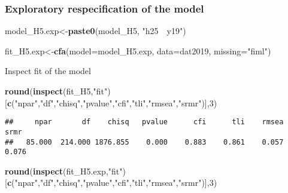 \documentclass[
]{article}
\newenvironment{Shaded}{\begin{snugshade}}{\end{snugshade}}
\newcommand{\DataTypeTok}[1]{\textcolor[rgb]{0.13,0.29,0.53}{#1}}
\newcommand{\DecValTok}[1]{\textcolor[rgb]{0.00,0.00,0.81}{#1}}
\newcommand{\KeywordTok}[1]{\textcolor[rgb]{0.13,0.29,0.53}{\textbf{#1}}}
\newcommand{\NormalTok}[1]{#1}
\newcommand{\StringTok}[1]{\textcolor[rgb]{0.31,0.60,0.02}{#1}}
\begin{document}
\hypertarget{exploratory-respecification-of-the-model-1}{%
\subsubsection{Exploratory respecification of the
model}\label{exploratory-respecification-of-the-model-1}}

\begin{Shaded}
\begin{Highlighting}[]
\NormalTok{model_H5.exp<-}\KeywordTok{paste0}\NormalTok{(model_H5,}
                      \StringTok{"h25~~y19"}\NormalTok{)}
\end{Highlighting}
\end{Shaded}

\begin{Shaded}
\begin{Highlighting}[]
\NormalTok{fit_H5.exp<-}\KeywordTok{cfa}\NormalTok{(}\DataTypeTok{model=}\NormalTok{model_H5.exp,}
              \DataTypeTok{data=}\NormalTok{dat2019,}
              \DataTypeTok{missing=}\StringTok{"fiml"}\NormalTok{)}
\end{Highlighting}
\end{Shaded}

Inspect fit of the model

\begin{Shaded}
\begin{Highlighting}[]
\KeywordTok{round}\NormalTok{(}\KeywordTok{inspect}\NormalTok{(fit_H5,}\StringTok{"fit"}\NormalTok{)}
\NormalTok{      [}\KeywordTok{c}\NormalTok{(}\StringTok{"npar"}\NormalTok{,}\StringTok{"df"}\NormalTok{,}\StringTok{"chisq"}\NormalTok{,}\StringTok{"pvalue"}\NormalTok{,}\StringTok{"cfi"}\NormalTok{,}\StringTok{"tli"}\NormalTok{,}\StringTok{"rmsea"}\NormalTok{,}\StringTok{"srmr"}\NormalTok{)],}\DecValTok{3}\NormalTok{)}
\end{Highlighting}
\end{Shaded}

\begin{verbatim}
##     npar       df    chisq   pvalue      cfi      tli    rmsea     srmr 
##   85.000  214.000 1876.855    0.000    0.883    0.861    0.057    0.076
\end{verbatim}

\begin{Shaded}
\begin{Highlighting}[]
\KeywordTok{round}\NormalTok{(}\KeywordTok{inspect}\NormalTok{(fit_H5.exp,}\StringTok{"fit"}\NormalTok{)}
\NormalTok{      [}\KeywordTok{c}\NormalTok{(}\StringTok{"npar"}\NormalTok{,}\StringTok{"df"}\NormalTok{,}\StringTok{"chisq"}\NormalTok{,}\StringTok{"pvalue"}\NormalTok{,}\StringTok{"cfi"}\NormalTok{,}\StringTok{"tli"}\NormalTok{,}\StringTok{"rmsea"}\NormalTok{,}\StringTok{"srmr"}\NormalTok{)],}\DecValTok{3}\NormalTok{)}
\end{Highlighting}
\end{Shaded}
\end{document}
